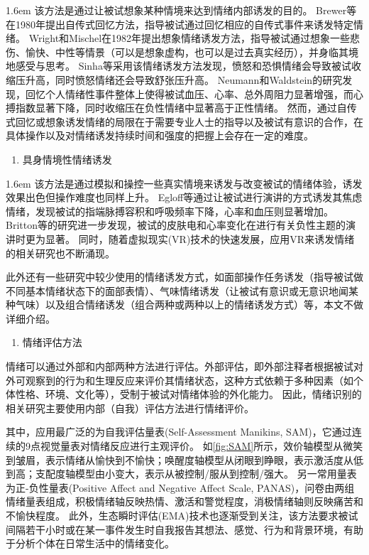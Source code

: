 \hangindent 1.6em
该方法是通过让被试想象某种情境来达到情绪内部诱发的目的。
Brewer等\cite{Brewer1980}在1980年提出自传式回忆方法，指导被试通过回忆相应的自传式事件来诱发特定情绪。
Wright和Mischel\cite{Wright1982}在1982年提出想象情绪诱发方法，指导被试通过想象一些悲伤、愉快、中性等情景（可以是想象虚构，也可以是过去真实经历），并身临其境地感受与思考。
Sinha等\cite{Sinha1992}采用该情绪诱发方法发现，愤怒和恐惧情绪会导致被试收缩压升高，同时愤怒情绪还会导致舒张压升高。
Neumann和Waldstein\cite{Neumann2001}的研究发现，回忆个人情绪性事件整体上使得被试血压、心率、总外周阻力显著增强，而心搏指数显著下降，同时收缩压在负性情绪中显著高于正性情绪。
然而，通过自传式回忆或想象诱发情绪的局限在于需要专业人士的指导以及被试有意识的合作，在具体操作以及对情绪诱发持续时间和强度的把握上会存在一定的难度。

\begin{enumerate}[\qquad(5)]
    \item 具身情境性情绪诱发
\end{enumerate}

\hangindent 1.6em
该方法是通过模拟和操控一些真实情境来诱发与改变被试的情绪体验，诱发效果出色但操作难度也同样上升。
Egloff等\cite{Egloff2002}通过让被试进行演讲的方式诱发其焦虑情绪，发现被试的指端脉搏容积和呼吸频率下降，心率和血压则显著增加。
Britton\cite{Britton2006}等的研究进一步发现，被试的皮肤电和心率变化在进行有关负性主题的演讲时更为显著。
同时，随着虚拟现实(VR)技术的快速发展，应用VR来诱发情绪的相关研究也不断涌现。

此外还有一些研究中较少使用的情绪诱发方式，如面部操作任务诱发（指导被试做不同基本情绪状态下的面部表情）、气味情绪诱发（让被试有意识或无意识地闻某种气味）以及组合情绪诱发（组合两种或两种以上的情绪诱发方式）等，本文不做详细介绍。

\begin{enumerate}[\hspace{1.2em}2.]    
    \item 情绪评估方法
\end{enumerate}

情绪可以通过外部和内部两种方法进行评估。外部评估，即外部注释者根据被试对外可观察到的行为和生理反应来评价其情绪状态，这种方式依赖于多种因素（如个体性格、环境、文化等），受制于被试对情绪体验的外化能力。
因此，情绪识别的相关研究主要使用内部（自我）评估方法进行情绪评价。

其中，应用最广泛的为自我评估量表(Self-Assessment Manikins, SAM)\cite{Bradley1994}，它通过连续的9点视觉量表对情绪反应进行主观评价。
如\autoref{fig:SAM}所示，效价轴模型从微笑到皱眉，表示情绪从愉快到不愉快；唤醒度轴模型从闭眼到睁眼，表示激活度从低到高；支配度轴模型由小变大，表示从被控制/服从到控制/强大。
另一常用量表为正-负性量表(Positive Affect and Negative Affect Scale, PANAS)，问卷由两组情绪量表组成，积极情绪轴反映热情、激活和警觉程度，消极情绪轴则反映痛苦和不愉快程度\cite{AMIGOS2017}。
此外，生态瞬时评估(EMA)技术也逐渐受到关注，该方法要求被试间隔若干小时或在某一事件发生时自我报告其想法、感觉、行为和背景环境，有助于分析个体在日常生活中的情绪变化。

